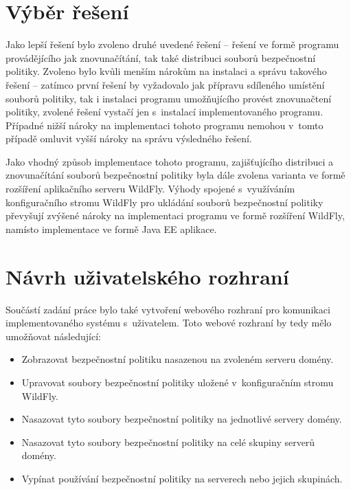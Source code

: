 \section{Výběr řešení} \label{vyberReseni}

Jako lepší řešení bylo zvoleno druhé uvedené řešení -- řešení ve formě programu provádějícího jak znovunačítání, tak také distribuci souborů bezpečnostní politiky.
Zvoleno bylo kvůli menším nárokům na instalaci a správu takového řešení -- zatímco první řešení by vyžadovalo jak přípravu sdíleného umístění souborů politiky, tak i instalaci programu umožňujícího provést znovunačtení politiky, zvolené řešení vystačí jen s~instalací implementovaného programu.
Případné nižší nároky na implementaci tohoto programu nemohou v~tomto případě omluvit vyšší nároky na správu výsledného řešení.

Jako vhodný způsob implementace tohoto programu, zajišťujícího distribuci a znovunačítání souborů bezpečnostní politiky byla dále zvolena varianta ve formě rozšíření aplikačního serveru WildFly.
Výhody spojené s~využíváním konfiguračního stromu WildFly pro ukládání souborů bezpečnostní politiky převyšují zvýšené nároky na implementaci programu ve formě rozšíření WildFly, namísto implementace ve formě Java EE aplikace.

\section{Návrh uživatelského rozhraní} \label{navrhGUI}

Součástí zadání práce bylo také vytvoření webového rozhraní pro komunikaci implementovaného systému s~uživatelem.
Toto webové rozhraní by tedy mělo umožňovat následující:

\begin{itemize}
  \item Zobrazovat bezpečnostní politiku nasazenou na zvoleném serveru domény.
  \item Upravovat soubory bezpečnostní politiky uložené v~konfiguračním stromu WildFly.
  \item Nasazovat tyto soubory bezpečnostní politiky na jednotlivé servery domény.
  \item Nasazovat tyto soubory bezpečnostní politiky na celé skupiny serverů domény.
  \item Vypínat používání bezpečnostní politiky na serverech nebo jejich skupinách.
\end{itemize}

